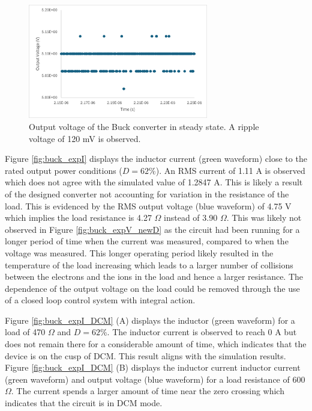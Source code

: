 \documentclass[12pt,twoside]{scrartcl}
\begin{document}
\begin{figure}[htp]
    \centering
    \includegraphics[width=0.7\textwidth]{buck_expV_ripple}
    \caption{Output voltage of the Buck converter in steady state. A ripple voltage of 120 mV is observed.}
    \label{fig:buck_expV_ripple}
\end{figure}

\noindent Figure \ref{fig:buck_expI} displays the inductor current (green waveform) close to the rated output power conditions ($D = 62$\%). An RMS current of 1.11 A is observed which does not agree with the simulated value of 1.2847 A. This is likely a result of the designed converter not accounting for variation in the resistance of the load. This is evidenced by the RMS output voltage (blue waveform) of 4.75 V which implies the load resistance is 4.27 $\Omega$ instead of 3.90 $\Omega$. This was likely not observed in Figure \ref{fig:buck_expV_newD} as the circuit had been running for a longer period of time when the current was measured, compared to when the voltage was measured. This longer operating period likely resulted in the temperature of the load increasing which leads to a larger number of collisions between the electrons and the ions in the load and hence a larger resistance. The dependence of the output voltage on the load could be removed through the use of a closed loop control system with integral action. \par
\vspace{5mm}
\noindent Figure \ref{fig:buck_expI_DCM} (A) displays the inductor (green waveform) for a load of 470 $\Omega$ and $D = 62$\%. The inductor current is observed to reach 0 A but does not remain there for a considerable amount of time, which indicates that the device is on the cusp of DCM. This result aligns with the simulation results. Figure \ref{fig:buck_expI_DCM} (B) displays the inductor current inductor current (green waveform) and output voltage (blue waveform) for a load resistance of 600 $\Omega$. The current spends a larger amount of time near the zero crossing which indicates that the circuit is in DCM mode.
\end{document}
